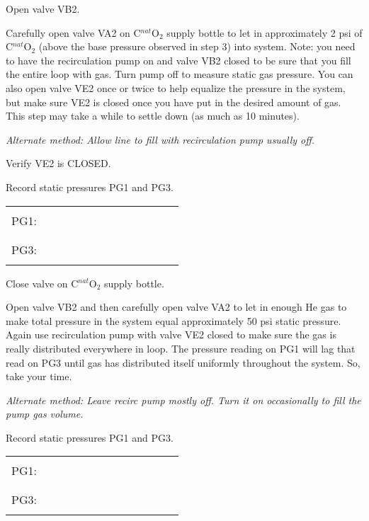 \begin{enumerate}
  
\checkitem Open valve VB2.
  
\checkitem Carefully open valve VA2 on  C$^{nat}$O$_{2}$ supply bottle
  to let in approximately 2 psi of  C$^{nat}$O$_{2}$ (above the
  base pressure observed in step 3) into system.
  Note:  you need to have the recirculation pump on and valve VB2
  closed to be sure that you fill the entire loop with gas.  Turn
  pump off to measure static gas pressure.  You can also open valve
  VE2 once or twice to help equalize the pressure in the system,
  but make sure VE2 is closed once you have put in the desired amount
  of gas.  This step may take a while to settle down (as much as 10 minutes).

  {\em Alternate method:  Allow line to fill with recirculation pump
   usually off.}
  
\checkitem Verify VE2 is CLOSED.

\checkitem Record static pressures PG1 and PG3.
     \begin{center}
     \begin{tabular}{|l|}
     \hline
      \\
     PG1:~~~~~~~~~~~~~~~~~~~~~~~~\\
      \\
     \hline
      \\
     PG3:~~~~~~~~~~~~~~~~~~~~~~~~\\
      \\
     \hline
     \end{tabular}
     \end{center}
  
\checkitem Close valve on  C$^{nat}$O$_{2}$ supply bottle.

\checkitem Open valve VB2 and then carefully open valve VA2 to let in
 enough He gas to make total pressure in the system equal approximately
  50 psi static pressure.  Again use recirculation pump with valve VE2
  closed to make sure the gas is really distributed everywhere in loop.
  The pressure reading on PG1 will lag that read on PG3 until gas has
  distributed itself uniformly throughout the system.  So, take your time.
  
  {\em Alternate method:  Leave recirc pump mostly off.  Turn it on
   occasionally to fill the pump gas volume.}
  
\checkitem Record static pressures PG1 and PG3.
     \begin{center}
     \begin{tabular}{|l|}
     \hline
      \\
     PG1:~~~~~~~~~~~~~~~~~~~~~~~~\\
      \\
     \hline
      \\
     PG3:~~~~~~~~~~~~~~~~~~~~~~~~\\
      \\
     \hline
     \end{tabular}
     \end{center}
  

\end{enumerate}
